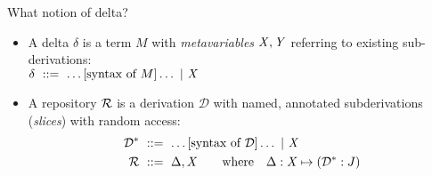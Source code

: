 \documentclass{beamer}
\theoremstyle{example}
\begin{document}
\begin{frame}{What notion of delta?}
  \begin{itemize}
  \item A \textcolor{greenish}{delta} $\delta$ is a term $M$ with
    \emph{metavariables} $\text{\textit{X}}, \text{\textit{Y}}$ referring to existing
    sub-derivations:\\[1em]

    $ \delta \ ::=\  \ldots \text{[syntax of $M$]} \ldots \ |\ 
    \text{\textit{X}} $\\[1em]

  \item A \textcolor{greenish}{repository} $\mathcal{R}$ is a derivation
    $\mathcal D$ with named, annotated subderivations (\emph{slices})
    with random access:
    \begin{align*}
      \mathcal D^* &\ ::=\  \ldots\text{[syntax of $\mathcal D$]}\ldots
      \ |\  \text{\textit{X}} \\
      \mathcal{R} &\ ::=\  \Delta, \text{\textit{X}} \qquad\text{where}\quad\Delta : \text{\textit{X}}\mapsto (\mathcal D^* : J)
    \end{align*}
  \end{itemize}
\end{frame}
\end{document}
